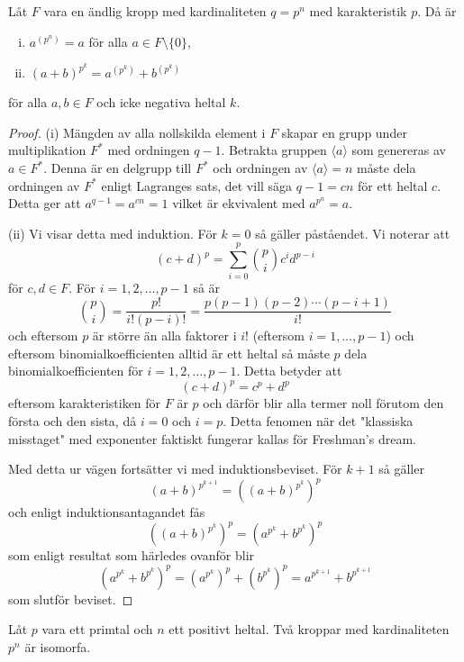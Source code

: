 \documentclass{article}
\theoremstyle{definition}
\begin{document}
\hypertarget{lemma8.0.1}{}
\begin{mylemma}{}{}
  Låt $F$ vara en ändlig kropp med kardinaliteten $q = p^n$ med karakteristik $p$. Då är 
  \begin{enumerate}[(i)]
    \item $a^{(p^n)} = a$ för alla $a \in F \setminus \{0\}$,
    \item $(a + b)^{p^k} = a^{(p^k)} + b^{(p^k)}$
  \end{enumerate}
  för alla $a, b \in F$ och icke negativa heltal $k$.
\end{mylemma}
\begin{proof}
  (i) Mängden av alla nollskilda element i $F$ skapar en grupp under multiplikation $F^*$ med ordningen $q-1$. Betrakta 
  gruppen $\langle a \rangle$ som genereras av $a \in F^*$. Denna är en delgrupp till $F^*$ och ordningen av $\langle a \rangle = n$ måste dela 
  ordningen av $F^*$ enligt Lagranges sats, det vill säga $q-1 = cn$ för ett heltal $c$. Detta ger att $a^{q-1} = a^{cn} = 1$ 
  vilket är ekvivalent med $a^{p^n} = a$.

  (ii) Vi visar detta med induktion. För $k = 0$ så gäller påståendet. Vi noterar att 
  \[(c + d)^p = \sum^p_{i = 0} \binom{p}{i}c^id^{p-i} \]
  för $c, d \in F$. För $i = 1, 2, \ldots, p-1$ så är 
  \[ \binom{p}{i} = \frac{p!}{i!(p-i)!} = \frac{p(p-1)(p-2)\cdots(p-i+1)}{i!} \]
  och eftersom $p$ är större än alla faktorer i $i!$ (eftersom $i = 1, \ldots, p-1$) och eftersom binomialkoefficienten alltid är ett heltal så måste 
  $p$ dela binomialkoefficienten för $i = 1, 2, \ldots, p-1$. Detta betyder att 
  \[(c + d)^p = c^p + d^p\]
  eftersom karakteristiken för $F$ är $p$ och därför blir alla termer noll förutom den första och den sista, då $i = 0$ och $i = p$.
  Detta fenomen när det "klassiska misstaget" med exponenter faktiskt fungerar kallas för Freshman's dream. 

  Med detta ur vägen fortsätter vi med induktionsbeviset. För $k + 1$ så gäller 
  \[ (a + b)^{p^{k+1}} = ((a + b)^{p^{k}})^p \]
  och enligt induktionsantagandet fås
  \[((a + b)^{p^{k}})^p = (a^{p^k} + b^{p^k})^p\]
  som enligt resultat som härledes ovanför blir 
  \[(a^{p^k} + b^{p^k})^p = (a^{p^k})^p + (b^{p^k})^p = a^{p^{k+1}} + b^{p^{k+1}}\]
  som slutför beviset.
\end{proof}

\begin{mytheo}{}{}
  Låt $p$ vara ett primtal och $n$ ett positivt heltal. Två kroppar med kardinaliteten $p^n$ är isomorfa. 
\end{mytheo}
\end{document}
